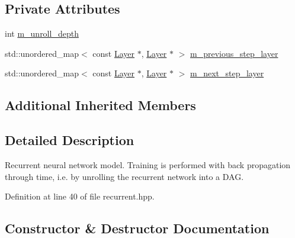 \subsection*{Private Attributes}
\begin{DoxyCompactItemize}
\item 
int \hyperlink{classlbann_1_1recurrent__model_a71eb93ebf3411a5c170f6570c93e3cca}{m\+\_\+unroll\+\_\+depth}
\item 
std\+::unordered\+\_\+map$<$ const \hyperlink{classlbann_1_1Layer}{Layer} $\ast$, \hyperlink{classlbann_1_1Layer}{Layer} $\ast$ $>$ \hyperlink{classlbann_1_1recurrent__model_ac728773d3de0cefb9390231dc176dca4}{m\+\_\+previous\+\_\+step\+\_\+layer}
\item 
std\+::unordered\+\_\+map$<$ const \hyperlink{classlbann_1_1Layer}{Layer} $\ast$, \hyperlink{classlbann_1_1Layer}{Layer} $\ast$ $>$ \hyperlink{classlbann_1_1recurrent__model_a426829f7fa36b112b4b91393c1657ddd}{m\+\_\+next\+\_\+step\+\_\+layer}
\end{DoxyCompactItemize}
\subsection*{Additional Inherited Members}


\subsection{Detailed Description}
Recurrent neural network model. Training is performed with back propagation through time, i.\+e. by unrolling the recurrent network into a D\+AG. 

Definition at line 40 of file recurrent.\+hpp.



\subsection{Constructor \& Destructor Documentation}
\mbox{\label{classlbann_1_1recurrent__model_ac1d3118a1642bd460c9cc9617a592a0b}} 
